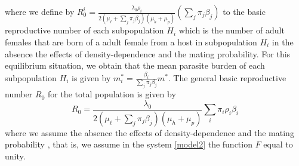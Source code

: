 \documentclass[12pt,a4paper]{article}
\theoremstyle{plain}%
\theoremstyle{definition}
\theoremstyle{remark}
\begin{document}
where we define by
$R_0^{i}=\frac{ \lambda_0 \rho_{i}}{2 (\mu_{\ell}+\sum_j \pi_j \beta_j )(\mu_{h}+\mu_p)} \left( \sum_j \pi_j\beta_{j} \right) $
to the basic reproductive number of each subpopulation $H_{i}$ which is the number of adult females 
that are born of a 
adult female from a host in subpopulation $H_{i}$ in the absence the effects of density-dependence and the mating probability.
For this equilibrium situation, we obtain that the mean parasite burden of each subpopulation $H_{i}$ is given by $m_{i}^*=\frac{\beta_{i}}{ \sum_j \pi_j\beta_{j } }m^*$.
The general basic reproductive number $R_0$ for the total population is given by %
\begin{equation}\label{valorR0}
	R_{0}=\frac{\lambda_0}
	{2 (\mu_{\ell}+\sum_j \pi_j \beta_j  )(\mu_{h}+\mu_p)}
	\sum_i \pi_i \rho_{i} \beta_{i}   
\end{equation}
where we assume the absence the effects of density-dependence and the mating probability \cite{anderson1992infectious}, that is, we assume in the system \eqref{model2} the function $F$ equal to unity.
\end{document}
